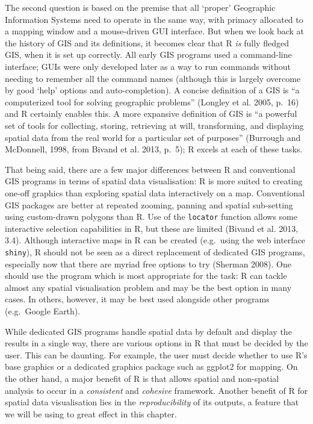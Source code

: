 \documentclass[]{article}
\begin{document}
The second question is based on the premise that all `proper' Geographic
Information Systems need to operate in the same way, with primacy
allocated to a mapping window and a mouse-driven GUI interface. But when
we look back at the history of GIS and its definitions, it becomes clear
that R \emph{is} fully fledged GIS, when it is set up correctly. All
early GIS programs used a command-line interface; GUIs were only
developed later as a way to run commands without needing to remember all
the command names (although this is largely overcome by good `help'
options and auto-completion). A concise definition of a GIS is ``a
computerized tool for solving geographic problems'' (Longley et al.
2005, p.~16) and R certainly enables this. A more expansive definition
of GIS is ``a powerful set of tools for collecting, storing, retrieving
at will, transforming, and displaying spatial data from the real world
for a particular set of purposes'' (Burrough and McDonnell, 1998, from
Bivand et al. 2013, p.~5); R excels at each of these tasks.

That being said, there are a few major differences between R and
conventional GIS programs in terms of spatial data visualisation: R is
more suited to creating one-off graphics than exploring spatial data
interactively on a map. Conventional GIS packages are better at repeated
zooming, panning and spatial sub-setting using custom-drawn polygons
than R. Use of the \texttt{locator} function allows some interactive
selection capabilities in R, but these are limited (Bivand et al. 2013,
3.4). Although interactive maps in R can be created (e.g.~using the web
interface \texttt{shiny}), R should not be seen as a direct replacement
of dedicated GIS programs, especially now that there are myriad free
options to try (Sherman 2008). One should use the program which is most
appropriate for the task: R can tackle almost any spatial visualisation
problem and may be the best option in many cases. In others, however, it
may be best used alongside other programs (e.g.~Google Earth).

While dedicated GIS programs handle spatial data by default and display
the results in a single way, there are various options in R that must be
decided by the user. This can be daunting. For example, the user must
decide whether to use R's base graphics or a dedicated graphics package
such as ggplot2 for mapping. On the other hand, a major benefit of R is
that allows spatial and non-spatial analysis to occur in a
\emph{consistent} and \emph{cohesive} framework. Another benefit of R
for spatial data visualisation lies in the \emph{reproducibility} of its
outputs, a feature that we will be using to great effect in this
chapter.
\end{document}
